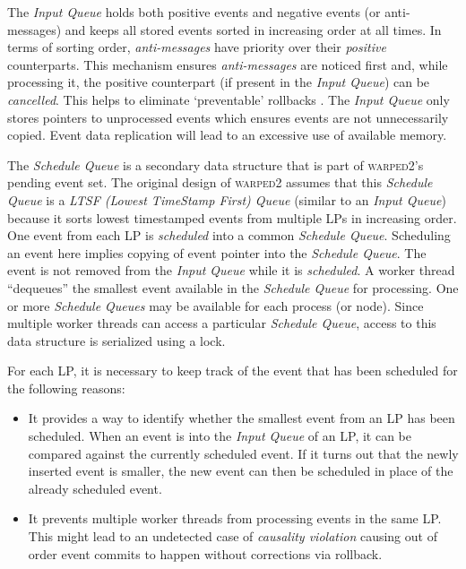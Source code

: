 \documentclass[11pt]{book}
\begin{document}
The \emph{Input Queue} holds both positive events and negative events (or anti-messages) and keeps all stored
events sorted in increasing order at all times.  In terms of sorting order, \emph{anti-messages} have priority
over their \emph{positive} counterparts.  This mechanism ensures \emph{anti-messages} are noticed first and,
while processing it, the positive counterpart (if present in the \emph{Input Queue}) can be \emph{cancelled}.
This helps to eliminate `preventable' rollbacks \cite{lubachevsky-89}.  The \emph{Input Queue} only stores
pointers to unprocessed events which ensures events are not unnecessarily copied.  Event data replication will
lead to an excessive use of available memory.

The \emph{Schedule Queue} is a secondary data structure that is part of \textsc{warped2}'s pending event set.
The original design of \textsc{warped2} assumes that this \emph{Schedule Queue} is a \emph{LTSF (Lowest
  TimeStamp First) Queue} (similar to an \emph{Input Queue}) because it sorts lowest timestamped events from
multiple LPs in increasing order.  One event from each LP is \emph{scheduled} into a common \emph{Schedule
  Queue}.  Scheduling an event here implies copying of event pointer into the \emph{Schedule Queue}.  The
event is not removed from the \emph{Input Queue} while it is \emph{scheduled}.  A worker thread ``dequeues''
the smallest event available in the \emph{Schedule Queue} for processing.  One or more \emph{Schedule Queues}
may be available for each process (or node).  Since multiple worker threads can access a particular
\emph{Schedule Queue}, access to this data structure is serialized using a lock.

For each LP, it is necessary to keep track of the event that has been scheduled for the following
reasons:

\begin{itemize}

\item It provides a way to identify whether the smallest event from an LP has been scheduled.  When an event
  is into the \emph{Input Queue} of an LP, it can be compared against the currently scheduled event.  If it
  turns out that the newly inserted event is smaller, the new event can then be scheduled in place of the
  already scheduled event.

\item It prevents multiple worker threads from processing events in the same LP.  This might lead to an
  undetected case of \emph{causality violation} causing out of order event commits to happen without
  corrections via rollback.

\end{itemize}
\end{document}
